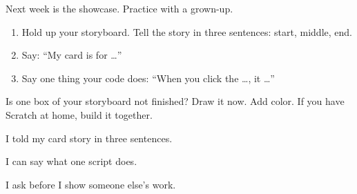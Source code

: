 
\begin{playathome}
Next week is the showcase. Practice with a grown-up.
\begin{enumerate}[leftmargin=1.4em,itemsep=2pt]
  \item Hold up your storyboard. Tell the story in three sentences: start, middle, end.
  \item Say: \enquote{My card is for \ldots}
  \item Say one thing your code does: \enquote{When you click the \ldots, it \ldots}
\end{enumerate}
\end{playathome}

\begin{playathome}
Is one box of your storyboard not finished? Draw it now. Add color. If you have Scratch at home, build it together.
\end{playathome}

\begin{selfcheck}
  \item I told my card story in three sentences.
  \item I can say what one script does.
  \item I ask before I show someone else's work.
\end{selfcheck}
